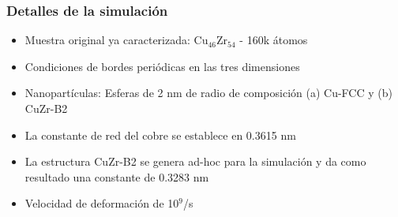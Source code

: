 \begin{frame}
 \frametitle{Detalles de la simulaci\'on}
 \vspace{0.3cm}
 \begin{itemize}
  \item Muestra original ya caracterizada: Cu$_{46}$Zr$_{54}$ - 160k \'atomos
  \item Condiciones de bordes peri\'odicas en las tres dimensiones
  \item Nanopart\'iculas: Esferas de 2 nm de radio de composici\'on (a) Cu-FCC y (b) CuZr-B2
  \item La constante de red del cobre se establece en 0.3615 nm
  \item La estructura CuZr-B2 se genera ad-hoc para la simulaci\'on y da como resultado una constante de 0.3283 nm
  \item Velocidad de deformaci\'on de 10$^{9}$/s
 \end{itemize}
\end{frame}

